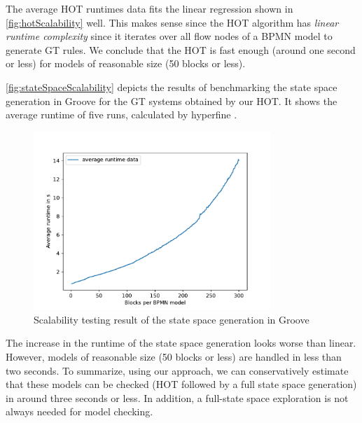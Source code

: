 \documentclass{lmcs} %
\begin{document}
The average HOT runtimes data fits the linear regression shown in \autoref{fig:hotScalability} well.
This makes sense since the HOT algorithm has \textit{linear runtime complexity} since it iterates over all flow nodes of a BPMN model to generate GT rules.
We conclude that the HOT is fast enough (around one second or less) for models of reasonable size (50 blocks or less).

\autoref{fig:stateSpaceScalability} depicts the results of benchmarking the state space generation in Groove for the GT systems obtained by our HOT.
It shows the average runtime of five runs, calculated by hyperfine \cite{peterHyperfine2023}.

\begin{figure}[ht]
    \centering
    \includegraphics[width=0.8\textwidth]{images/StateSpaceGeneration_scalability.pdf}
    \caption{Scalability testing result of the state space generation in Groove}
    \label{fig:stateSpaceScalability}
\end{figure}

The increase in the runtime of the state space generation looks worse than linear.
However, models of reasonable size (50 blocks or less) are handled in less than two seconds.
To summarize, using our approach, we can conservatively estimate that these models can be checked (HOT followed by a full state space generation) in around three seconds or less.
In addition, a full-state space exploration is not always needed for model checking.
\end{document}
